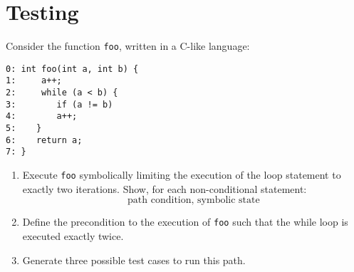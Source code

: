 \section{Testing}

Consider the function \texttt{foo}, written in a C-like language:
\begin{lstlisting}[style=C]
0: int foo(int a, int b) { 
1:     a++;
2:     while (a < b) {
3:        if (a != b)
4:        a++; 
5:    }
6:    return a;
7: }
\end{lstlisting}
\begin{enumerate}
    \item Execute \texttt{foo} symbolically limiting the execution of the loop statement to exactly two iterations. 
        Show, for each non-conditional statement:
        \[\text{path condition, symbolic state}\]
    \item Define the precondition to the execution of \texttt{foo} such that the while loop is executed exactly twice. 
    \item Generate three possible test cases to run this path. 
\end{enumerate}

